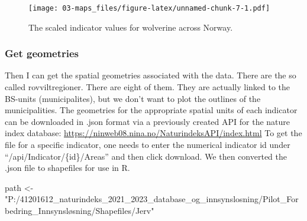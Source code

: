\documentclass[
]{book}
\newenvironment{Shaded}{\begin{snugshade}}{\end{snugshade}}
\newcommand{\CommentTok}[1]{\textcolor[rgb]{0.56,0.35,0.01}{\textit{#1}}}
\newcommand{\FunctionTok}[1]{\textcolor[rgb]{0.00,0.00,0.00}{#1}}
\newcommand{\NormalTok}[1]{#1}
\newcommand{\OtherTok}[1]{\textcolor[rgb]{0.56,0.35,0.01}{#1}}
\newcommand{\SpecialCharTok}[1]{\textcolor[rgb]{0.00,0.00,0.00}{#1}}
\newcommand{\StringTok}[1]{\textcolor[rgb]{0.31,0.60,0.02}{#1}}
\begin{document}
\begin{figure}
\centering
\texttt{[image: 03-maps\_files/figure-latex/unnamed-chunk-7-1.pdf]}
\caption{\label{fig:unnamed-chunk-7}The scaled indicator values for wolverine across Norway.}
\end{figure}

\hypertarget{get-geometries}{%
\subsubsection{Get geometries}\label{get-geometries}}

Then I can get the spatial geometries associated with the data. There are the so called rovviltregioner. There are eight of them. They are actually linked to the BS-units (municipalites), but we don't want to plot the outlines of the municipalities.
The geometries for the appropriate spatial units of each indicator can be downloaded in .json format via a previously created API for the nature index database: \url{https://ninweb08.nina.no/NaturindeksAPI/index.html}
To get the file for a specific indicator, one needs to enter the numerical indicator id under ``/api/Indicator/\{id\}/Areas'' and then click download. We then converted the .json file to shapefiles for use in R.

\begin{Shaded}
\begin{Highlighting}[]
\NormalTok{path }\OtherTok{\textless{}{-}} \StringTok{"P:/41201612\_naturindeks\_2021\_2023\_database\_og\_innsynslosning/Pilot\_Forbedring\_Innsynsløsning/Shapefiles/Jerv"}
\end{Highlighting}
\end{Shaded}

\begin{Shaded}
\end{Shaded}
\end{document}
